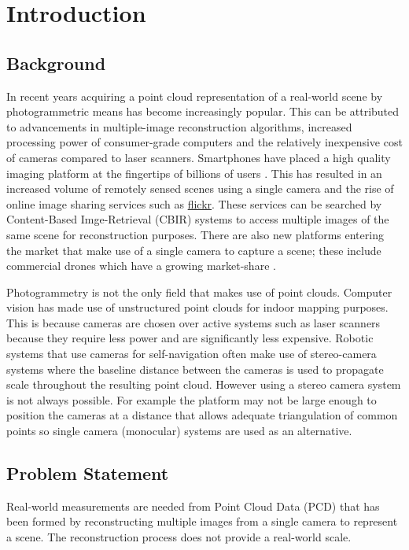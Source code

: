 \chapter{Introduction} %
\label{Chapter1}


\section{Background}
In recent years acquiring a point cloud representation of a real-world scene by photogrammetric means has become increasingly popular. This can be attributed to advancements in multiple-image reconstruction algorithms, increased processing power of consumer-grade computers and the relatively inexpensive cost of cameras compared to laser scanners. Smartphones have placed a high quality imaging platform at the fingertips of billions of users \citep{richter_infographic:_2012}. This has resulted in an increased volume of remotely sensed scenes using a single camera and the rise of online image sharing services such as \href{https://www.flickr.com/}{flickr}. These services can be searched by Content-Based Imge-Retrieval (CBIR) systems to access multiple images of the same scene for reconstruction purposes. There are also new platforms entering the market that make use of a single camera to capture a scene; these include commercial drones which have a growing market-share \citep{insider_drones_2015}.

Photogrammetry is not the only field that makes use of point clouds. Computer vision has made use of unstructured point clouds for indoor mapping purposes. This is because cameras are chosen over active systems such as laser scanners because they require less power and are significantly less expensive. Robotic systems that use cameras for self-navigation often make use of stereo-camera systems where the baseline distance between the cameras is used to propagate scale throughout the resulting point cloud. However using a stereo camera system is not always possible. For example the platform may not be large enough to position the cameras at a distance that allows adequate triangulation of common points so single camera (monocular) systems are used as an alternative. 
 
\section{Problem Statement \label{problem}}
Real-world measurements are needed from Point Cloud Data (PCD) that has been formed by reconstructing multiple images from a single camera to represent a scene. The reconstruction process does not provide a real-world scale.

